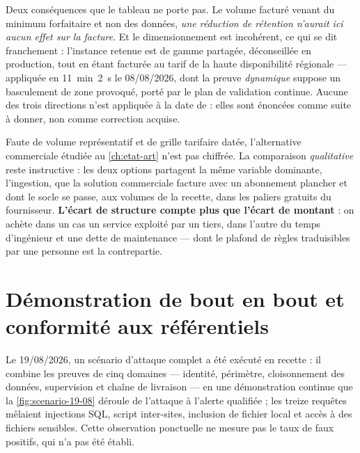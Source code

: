 Deux conséquences que le tableau ne porte pas. Le volume facturé venant du minimum forfaitaire et
non des données, \emph{une réduction de rétention n'aurait ici aucun effet sur la facture}. Et le
dimensionnement est incohérent, ce qui se dit franchement : l'instance retenue est de gamme
partagée, déconseillée en production, tout en étant facturée au tarif de la haute disponibilité
régionale --- appliquée en 11~min~2~s le 08/08/2026, dont la preuve \emph{dynamique} suppose un
basculement de zone provoqué, porté par le plan de validation continue. Aucune des trois directions
n'est appliquée à la date de \dateref{} : elles sont énoncées comme suite à donner, non comme
correction acquise.

Faute de volume représentatif et de grille tarifaire datée, l'alternative commerciale étudiée au
\cref{ch:etat-art} n'est pas chiffrée. La comparaison \emph{qualitative} reste instructive : les deux
options partagent la même variable dominante, l'ingestion, que la solution commerciale facture avec
un abonnement plancher et dont le socle se passe, aux volumes de la recette, dans les paliers
gratuits du fournisseur. \textbf{L'écart de structure compte plus que l'écart de montant} : on
achète dans un cas un service exploité par un tiers, dans l'autre du temps d'ingénieur et une dette
de maintenance --- dont le plafond de règles traduisibles par une personne est la contrepartie.

\section{Démonstration de bout en bout et conformité aux référentiels}
\label{sec:demonstration}

Le 19/08/2026, un scénario d'attaque complet a été exécuté en recette : il combine les preuves de
cinq domaines --- identité, périmètre, cloisonnement des données, supervision et chaîne de
livraison --- en une démonstration continue que la \cref{fig:scenario-19-08} déroule de l'attaque à
l'alerte qualifiée ; les treize requêtes mêlaient injections SQL, script inter-sites, inclusion de
fichier local et accès à des fichiers sensibles. Cette observation ponctuelle ne mesure pas le taux
de faux positifs, qui n'a pas été établi.


